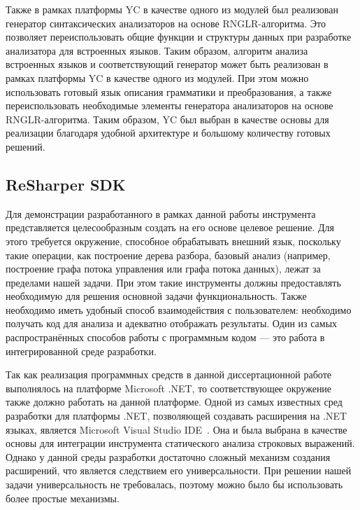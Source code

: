     Также в рамках платформы YC в качестве одного из модулей был реализован генератор синтаксических анализаторов на основе RNGLR-алгоритма. Это позволяет переиспользовать общие функции и структуры данных при разработке анализатора для встроенных языков. 
    Таким образом, алгоритм анализа встроенных языков и соответствующий генератор может быть реализован в рамках платформы YC в качестве одного из модулей. При этом можно использовать готовый язык описания грамматики и преобразования, а также переиспользовать необходимые элементы генератора анализаторов на основе RNGLR-алгоритма. Таким образом, YC был выбран в качестве основы для реализации благодаря удобной архитектуре и большому количеству готовых решений. 


\subsection{ReSharper SDK}\label{ReSharperSDKDescr}

    Для демонстрации разработанного в рамках данной работы инструмента представляется целесообразным создать на его основе целевое решение. Для этого требуется окружение, способное обрабатывать внешний язык, поскольку такие операции, как построение дерева разбора, базовый анализ (например, построение графа потока управления или графа потока данных), лежат за пределами нашей задачи. При этом такие инструменты должны предоставлять необходимую для решения основной задачи функциональность. Также необходимо иметь удобный способ взаимодействия с пользователем: необходимо получать код для анализа и адекватно отображать результаты. Один из самых распространённых способов работы с программным кодом --- это работа в интегрированной среде разработки.

    Так как реализация программных средств в данной диссертационной работе выполнялось на платформе Microsoft .NET, то соответствующее окружение также должно работать на данной платформе. Одной из самых известных сред разработки для платформы .NET, позволяющей создавать расширения на .NET языках, является Microsoft Visual Studio IDE~\cite{MSVSIDE}. Она и была выбрана в качестве основы для интеграции инструмента статического анализа строковых выражений. Однако у данной среды разработки достаточно сложный механизм создания расширений, что является следствием его универсальности. При решении нашей задачи универсальность не требовалась, поэтому можно было бы использовать более простые механизмы.

